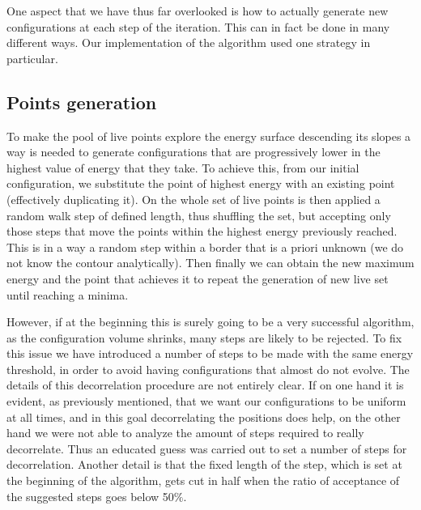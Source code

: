 \documentclass[a4paper, 12pt]{article}          %
\begin{document}
One aspect that we have thus far overlooked is how to actually generate new configurations at each step of the iteration. This can in fact be done in many different ways. Our implementation of the algorithm used one strategy in particular. 

\subsection{Points generation}
To make the pool of live points explore the energy surface descending its slopes a way is needed to generate configurations that are progressively lower in the highest value of energy that they take. To achieve this, from our initial configuration, we substitute the point of highest energy with an existing point (effectively duplicating it). On the whole set of live points is then applied a random walk step of defined length, thus shuffling the set, but accepting only those steps that move the points within the highest energy previously reached. This is in a way a random step within a border that is a priori unknown (we do not know the contour analytically). Then finally we can obtain the new maximum energy and the point that achieves it to repeat the generation of new live set until reaching a minima.

However, if at the beginning this is surely going to be a very successful algorithm, as the configuration volume shrinks, many steps are likely to be rejected. To fix this issue we have introduced a number of steps to be made with the same energy threshold, in order to avoid having configurations that almost do not evolve. The details of this decorrelation procedure are not entirely clear. If on one hand it is evident, as previously mentioned, that we want our configurations to be uniform at all times, and in this goal decorrelating the positions does help, on the other hand we were not able to analyze the amount of steps required to really decorrelate. Thus an educated guess was carried out to set a number of steps for decorrelation. Another detail is that the fixed length of the step, which is set at the beginning of the algorithm, gets cut in half when the ratio of acceptance of the suggested steps goes below 50$\%$.
\end{document}
